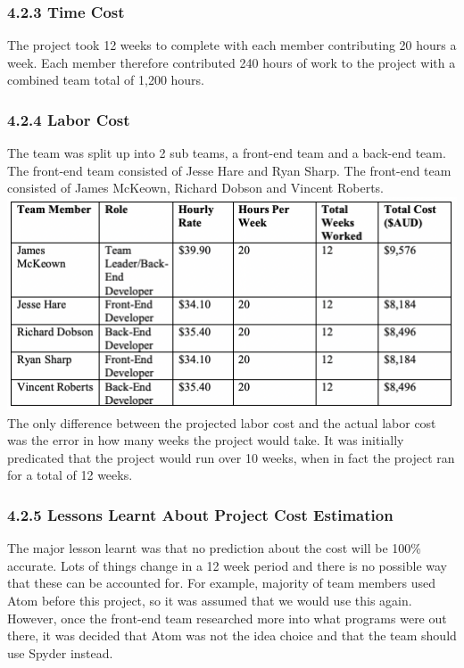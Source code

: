 \documentclass[11pt]{article}
\begin{document}
\begin{adjustwidth}{1cm}{}
\subsubsection{4.2.3 Time Cost}
The project took 12 weeks to complete with each member contributing 20 hours a week. Each member therefore contributed 240 hours of work to the project with a combined team total of 1,200 hours.

\subsubsection{4.2.4 Labor Cost}
The team was split up into 2 sub teams, a front-end team and a back-end team. The front-end team consisted of Jesse Hare and Ryan Sharp. The front-end team consisted of James McKeown, Richard Dobson and Vincent Roberts. \\

\includegraphics[scale=0.71]{team_cost.png} \\

The only difference between the projected labor cost and the actual labor cost was the error in how many weeks the project would take. It was initially predicated that the project would run over 10 weeks, when in fact the project ran for a total of 12 weeks.

\subsubsection{4.2.5 Lessons Learnt About Project Cost Estimation}
The major lesson learnt was that no prediction about the cost will be 100\% accurate. Lots of things change in a 12 week period and there is no possible way that these can be accounted for. For example, majority of team members used Atom before this project, so it was assumed that we would use this again. However, once the front-end team researched more into what programs were out there, it was decided that Atom was not the idea choice and that the team should use Spyder instead. \\

\end{adjustwidth}
\end{document}
